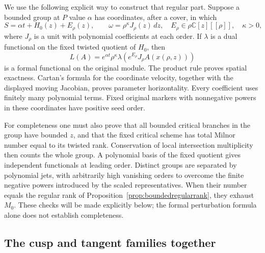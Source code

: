 \documentclass[11pt]{article}
\theoremstyle{definition}\newtheorem{definition}[theorem]{Definition}
\theoremstyle{remark}\newtheorem{remark}[theorem]{Remark}
\newcommand{\C}{\mathbb C}
\begin{document}
We use the following explicit way to construct that regular part.
Suppose a bounded group at $P$ value $\alpha$ has coordinates,
after a cover, in which
\begin{equation}\label{eq:boundedfixedmodel}
 S=\alpha t+H_0(z)+E_\rho(z),\qquad
 \omega=\rho^\kappa J_\rho(z)\,dz,
 \quad E_\rho\in\rho\C[z][[\rho]],\quad\kappa>0,
\end{equation}
where $J_\rho$ is a unit with polynomial coefficients at each
order. If $\lambda$ is a dual functional on the fixed twisted
quotient of $H_0$, then
\[
 L(A)=e^{\alpha t}\rho^\kappa\lambda\!\left(
           e^{E_\rho}J_\rho A(x(\rho,z))\right)
\]
is a formal functional on the original module. The product rule
proves spatial exactness. Cartan's formula for the coordinate
velocity, together with the displayed moving Jacobian, proves
parameter horizontality. Every coefficient uses finitely many
polynomial terms. Fixed original markers with nonnegative powers
in these coordinates have positive seed order.

For completeness one must also prove that all bounded critical
branches in the group have bounded $z$, and that the fixed
critical scheme has total Milnor number equal to its twisted
rank. Conservation of local intersection multiplicity then
counts the whole group. A polynomial basis of the fixed quotient
gives independent functionals at leading order. Distinct groups
are separated by polynomial jets, with arbitrarily high vanishing
orders to overcome the finite negative powers introduced by the
scaled representatives. When their number equals the regular
rank of Proposition~\ref{prop:boundedregularrank}, they exhaust
$M_0$. These checks will be made explicitly below; the formal
perturbation formula alone does not establish completeness.

\subsection{The cusp and tangent families together}
\label{sec:cusptangent}
\end{document}
